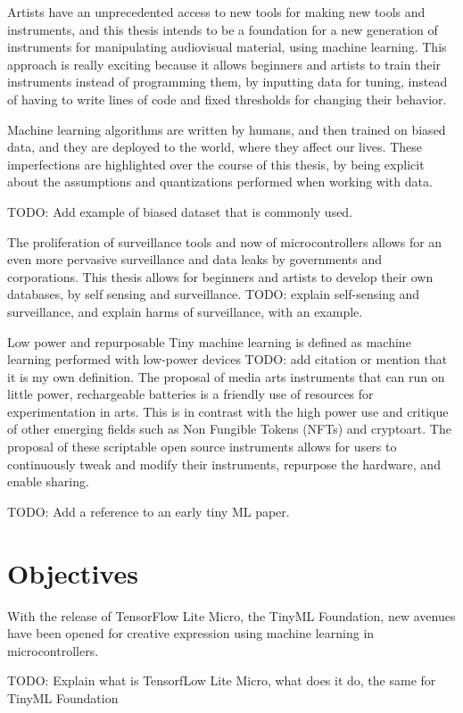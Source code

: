 Artists have an unprecedented access to new tools for making new tools and instruments, and this thesis intends to be a foundation for a new generation of instruments for manipulating audiovisual material, using machine learning. This approach is really exciting because it allows beginners and artists to train their instruments instead of programming them, by inputting data for tuning, instead of having to write lines of code and fixed thresholds for changing their behavior.

Machine learning algorithms are written by humans, and then trained on biased data, and they are deployed to the world, where they affect our lives. These imperfections are highlighted over the course of this thesis, by being explicit about the assumptions and quantizations performed when working with data.

TODO: Add example of biased dataset that is commonly used.

The proliferation of surveillance tools and now of microcontrollers allows for an even more pervasive surveillance and data leaks by governments and corporations. This thesis allows for beginners and artists to develop their own databases, by self sensing and surveillance. TODO: explain self-sensing and surveillance, and explain harms of surveillance, with an example.

Low power and repurposable
Tiny machine learning is defined as machine learning performed with low-power devices TODO: add citation or mention that it is my own definition. The proposal of media arts instruments that can run on little power, rechargeable batteries is a friendly use of resources for experimentation in arts. This is in contrast with the high power use and critique of other emerging fields such as Non Fungible Tokens (NFTs) and cryptoart. The proposal of these scriptable open source instruments allows for users to continuously tweak and modify their instruments, repurpose the hardware, and enable sharing.

TODO: Add a reference to an early tiny ML paper.

\section{Objectives}

With the release of TensorFlow Lite Micro, the TinyML Foundation, new avenues have been opened for creative expression using machine learning in microcontrollers.

TODO: Explain what is TensorfLow Lite Micro, what does it do, the same for TinyML Foundation


